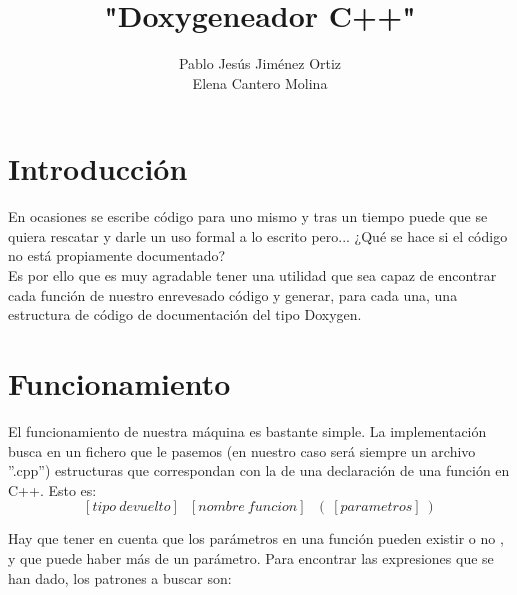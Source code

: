 \documentclass[11pt]{article}
\title{\textbf{"Doxygeneador C++"}}
\author{Pablo Jesús Jiménez Ortiz \\ Elena Cantero Molina}
\date{}
\begin{document}
\maketitle

\section{Introducción}
En ocasiones se escribe código para uno mismo y tras un tiempo puede que se quiera rescatar y darle un uso formal a lo escrito pero... ¿Qué se hace si el código no está propiamente documentado?\\

Es por ello que es muy agradable tener una utilidad que sea capaz de encontrar cada función de nuestro enrevesado código y generar, para cada una, una estructura de código de documentación del tipo Doxygen.

\section{Funcionamiento}

El funcionamiento de nuestra máquina es bastante simple. La implementación busca en un fichero que le pasemos (en nuestro caso será siempre un archivo ”.cpp”) estructuras que correspondan con la de una declaración de una función en C++. Esto es:
\[
[tipo \ devuelto] \ \ \ [nombre \ funcion] \ \ \ ( \ [parametros] \ )
\]

Hay que tener en cuenta que los parámetros en una función pueden existir o no , y que puede haber más de un parámetro. Para encontrar las expresiones que se han dado, los patrones a buscar son:
\end{document}
